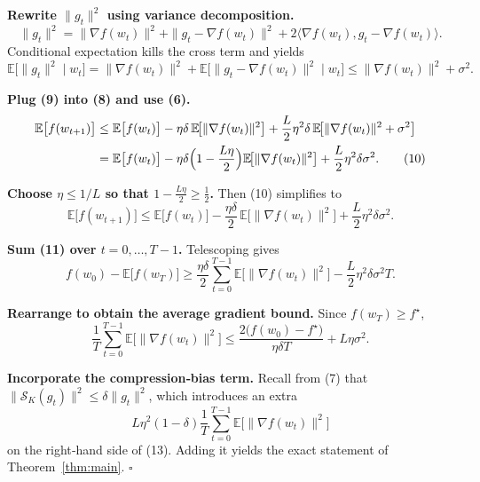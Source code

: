 \documentclass{article}
\newcommand{\E}{\mathbb{E}}
\newcommand{\cK}{\mathcal{S}_K}
\begin{document}
\begin{enumerate}[label={[\textbf{Step \arabic*}]}]
\item \textbf{Rewrite $\|g_t\|^{2}$ using variance decomposition.}
\[
\|g_t\|^{2}= \|\nabla f(w_t)\|^{2}+ \|g_t-\nabla f(w_t)\|^{2}
          +2\langle\nabla f(w_t),g_t-\nabla f(w_t)\rangle.
\]
Conditional expectation kills the cross term and yields
\[
\E\!\big[\|g_t\|^{2}\mid w_t\big]
= \|\nabla f(w_t)\|^{2}+ \E\!\big[\|g_t-\nabla f(w_t)\|^{2}\mid w_t\big]
\le \|\nabla f(w_t)\|^{2}+ \sigma^{2}. \tag{9}
\]

\item \textbf{Plug (9) into (8) and use (6).}
\begin{align}
\E\big[f(w_{t+1})\big]
&\le \E\big[f(w_t)\big]
   -\eta\delta\,\E\!\big[\|\nabla f(w_t)\|^{2}\big]
   +\frac{L}{2}\eta^{2}\delta\,
      \E\!\big[\|\nabla f(w_t)\|^{2}+\sigma^{2}\big] \nonumber\\
&= \E\big[f(w_t)\big]
   -\eta\delta\Bigl(1-\frac{L\eta}{2}\Bigr)
      \E\!\big[\|\nabla f(w_t)\|^{2}\big]
   +\frac{L}{2}\eta^{2}\delta\sigma^{2}. \tag{10}
\end{align}

\item \textbf{Choose $\eta\le 1/L$ so that $1-\frac{L\eta}{2}\ge\frac12$.}
Then (10) simplifies to
\[
\E\big[f(w_{t+1})\big]
\le \E\big[f(w_t)\big]
   -\frac{\eta\delta}{2}\,\E\!\big[\|\nabla f(w_t)\|^{2}\big]
   +\frac{L}{2}\eta^{2}\delta\sigma^{2}. \tag{11}
\]

\item \textbf{Sum (11) over $t=0,\dots,T-1$.}
Telescoping gives
\[
f(w_0)-\E\big[f(w_T)\big]
\ge \frac{\eta\delta}{2}\sum_{t=0}^{T-1}
      \E\!\big[\|\nabla f(w_t)\|^{2}\big]
   -\frac{L}{2}\eta^{2}\delta\sigma^{2}T. \tag{12}
\]

\item \textbf{Rearrange to obtain the average gradient bound.}
Since $f(w_T)\ge f^{\star}$,
\[
\frac{1}{T}\sum_{t=0}^{T-1}\E\!\big[\|\nabla f(w_t)\|^{2}\big]
\le
\frac{2\big(f(w_0)-f^{\star}\big)}{\eta\delta T}
   +L\eta\sigma^{2}. \tag{13}
\]

\item \textbf{Incorporate the compression‑bias term.}  
Recall from (7) that $\|\cK(g_t)\|^{2}\le\delta\|g_t\|^{2}$, which introduces an extra
\[
L\eta^{2}(1-\delta)\frac{1}{T}\sum_{t=0}^{T-1}\E\!\big[\|\nabla f(w_t)\|^{2}\big]
\]
on the right‑hand side of (13). Adding it yields the exact statement of Theorem~\ref{thm:main}. \hfill $\square$
\end{enumerate}
\end{document}
